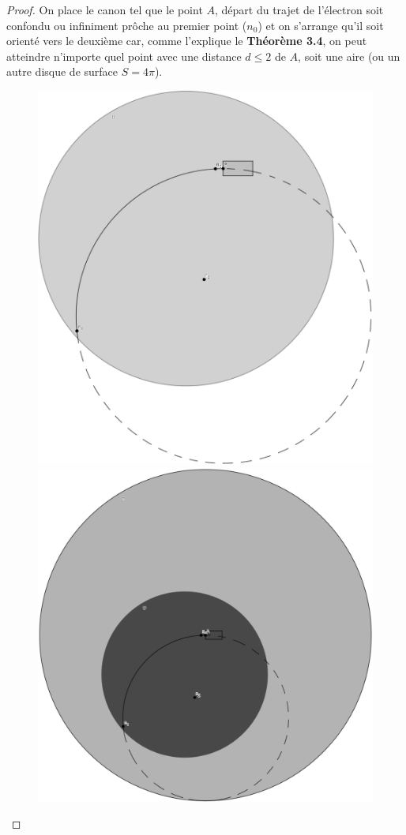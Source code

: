 \documentclass[a4paper]{amsart}
\theoremstyle{definition}
\theoremstyle{remark}
\numberwithin{equation}{section}
\begin{document}
\begin{proof}
  On place le canon tel que le point $A$, départ du trajet de l'électron soit confondu ou infiniment prôche au premier point ($n_0$) et on s'arrange qu'il soit orienté vers le deuxième car, comme l'explique le \textbf{Théorème 3.4}, on peut atteindre n'importe quel point avec une distance $d\leq2$ de $A$, soit une aire (ou un autre disque de surface $S=4\pi$).

  \begin{figure}[H]
    \centering
    \includegraphics[scale=0.105]{images/q3.png}
    \includegraphics[scale=0.105]{images/q3_generalization.png}

\end{figure}
\end{proof}
\end{document}
